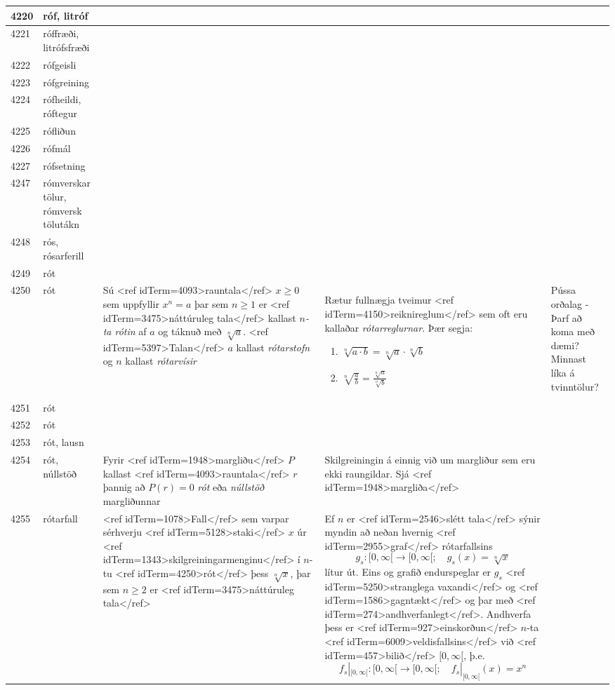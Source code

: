 \begin{longtable}{p{}|p{}|p{}|p{}|p{}}
4220 & róf, litróf &  &  &  \\
\hline
4221 & róffræði, litrófsfræði &  &  &  \\
\hline
4222 & rófgeisli &  &  &  \\
\hline
4223 & rófgreining &  &  &  \\
\hline
4224 & rófheildi, róftegur &  &  &  \\
\hline
4225 & rófliðun &  &  &  \\
\hline
4226 & rófmál &  &  &  \\
\hline
4227 & rófsetning &  &  &  \\
\hline
4247 & rómverskar tölur, rómversk tölutákn &  &  &  \\
\hline
4248 & rós, rósarferill &  &  &  \\
\hline
4249 & rót &  &  &  \\
\hline
4250 & rót & Sú <ref idTerm=4093>rauntala</ref> $x \geq 0$ sem uppfyllir $x^n=a$ þar sem $n \geq 1$ er <ref idTerm=3475>náttúruleg tala</ref> kallast \textit{$n$-ta rótin} af $a$ og táknuð með $\sqrt[n]{a}$. <ref idTerm=5397>Talan</ref> $a$ kallast \textit{rótarstofn} og $n$ kallast \textit{rótarvísir} & Rætur fullnægja tveimur <ref idTerm=4150>reiknireglum</ref> sem oft eru kallaðar \textit{rótarreglurnar}. Þær segja:

\begin{enumerate}
    \item $\sqrt[n]{a \cdot b} = \sqrt[n]{a} \cdot \sqrt[n]{b}$
    \item $\displaystyle{\sqrt[n]{\frac{a}{b}} = \frac{\sqrt[n]{a}}{\sqrt[n]{b}}}$
\end{enumerate} & Pússa orðalag - Þarf að koma með dæmi? Minnast líka á tvinntölur? \\
\hline
4251 & rót &  &  &  \\
\hline
4252 & rót &  &  &  \\
\hline
4253 & rót, lausn & & & \\
\hline
4254 & rót, núllstöð & Fyrir <ref idTerm=1948>margliðu</ref> $P$ kallast <ref idTerm=4093>rauntala</ref> $r$ þannig að $P(r)=0$ \textit{rót} eða \textit{núllstöð} margliðunnar & Skilgreiningin á einnig við um margliður sem eru ekki raungildar. Sjá <ref idTerm=1948>margliða</ref> & \\
\hline
4255 & rótarfall & <ref idTerm=1078>Fall</ref> sem varpar sérhverju <ref idTerm=5128>staki</ref> $x$ úr <ref idTerm=1343>skilgreiningarmenginu</ref> í $n$-tu <ref idTerm=4250>rót</ref> þess $\sqrt[n]{x}$, þar sem $n \geq 2$ er <ref idTerm=3475>náttúruleg tala</ref> & Ef $n$ er <ref idTerm=2546>slétt tala</ref> sýnir myndin að neðan hvernig <ref idTerm=2955>graf</ref> rótarfallsins \[ g_s: [0, \infty[ \to [0, \infty[; \quad g_s(x) = \sqrt[n]{x} \] lítur út. Eins og grafið endurspeglar er $g_s$ <ref idTerm=5250>stranglega vaxandi</ref> og <ref idTerm=1586>gagntækt</ref> og þar með <ref idTerm=274>andhverfanlegt</ref>. Andhverfa þess er <ref idTerm=927>einskorðun</ref> $n$-ta <ref idTerm=6009>veldisfallsins</ref> við <ref idTerm=457>bilið</ref> $[0, \infty[$, þ.e. \[ f_s|_{[0,\infty[}: [0, \infty[ \to [0, \infty[; \quad f_s|_{[0,\infty[}(x) = x^n \] 


\end{longtable}
